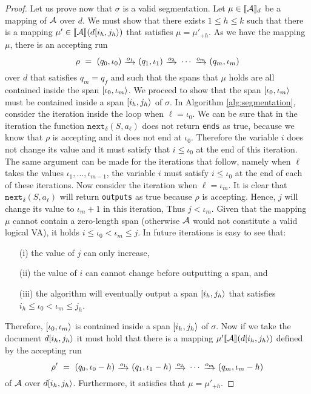 \begin{proof}
    Let us prove now that $\sigma$ is a valid segmentation. Let $\mu \in
    \llbracket\mathcal{A}\rrbracket_d$ be a mapping of $\mathcal{A}$ over $d$. We must show that there exists
    $1 \leq h \leq k$ such that there is a mapping $\mu' \in
    \llbracket\mathcal{A}\rrbracket(d[i_h, j_h\rangle)$ that satisfies $\mu = \mu'_{+h}$. As we have
    the mapping $\mu$, there is an accepting run 
    $$
    \rho \ = \ (q_0, \iota_0) \ \trans{o_1} \ (q_1, \iota_1) \ \trans{o_2} \ \cdots \ \trans{o_m} \ (q_m, \iota_m)
    $$ 
    over $d$ that satisfies $q_m = q_f$ and such that the spans that $\mu$ holds
    are all contained inside the span $[\iota_0, \iota_m\rangle$. We proceed to
    show that the span $[\iota_0, \iota_m\rangle$ must be contained inside a
    span $[i_h, j_h\rangle$ of $\sigma$. In Algorithm \ref{alg:segmentation},
    consider the iteration inside the loop when $\ell = \iota_0$. We can be sure
    that in the iteration the function $\texttt{next}_\delta(S, a_\ell)$ does
    not return \texttt{ends} as true, because we know that $\rho$ is accepting
    and it does not end at $\iota_0$. Therefore the variable $i$ does not change
    its value and it must satisfy that $i \leq \iota_0$ at the end of this
    iteration. The same argument can be made for the iterations that follow,
    namely when $\ell$ takes the values $\iota_1, \ldots, \iota_{m-1}$, the
    variable $i$ must satisfy $i \leq \iota_0$ at the end of each of these
    iterations. Now consider the iteration when $\ell = \iota_m$. It is clear
    that $\texttt{next}_\delta(S, a_\ell)$ will return \texttt{outputs} as true
    because $\rho$ is accepting. Hence, $j$ will change its value to $\iota_m +
    1$ in this iteration, Thus $j < \iota_m$. Given that the mapping $\mu$
    cannot contain a zero-length span (otherwise $\mathcal{A}$ would not constitute a
    valid logical VA), it holds $i \leq \iota_0 < \iota_m \leq j$. In future
    iterations is easy to see that:
    \begin{enumerate}
        \item[(i)] the value of $j$ can only increase,
        \item[(ii)] the value of $i$ can cannot change before outputting a span,
        and
        \item[(iii)] the algorithm will eventually output a span $[i_h,
        j_h\rangle$ that satisfies $i_h \leq \iota_0 < \iota_m \leq j_h$. 
    \end{enumerate}
    Therefore, $[\iota_0, \iota_m\rangle$ is contained inside a span
    $[i_h, j_h\rangle$ of $\sigma$. Now if we take the document $d[i_h,
    j_h\rangle$ it must hold that there is a mapping $\mu' \llbracket\mathcal{A}\rrbracket(d[i_h,
    j_h\rangle)$ defined by the accepting run 
    $$
    \rho' \ = \ (q_0, \iota_0-h) \ \trans{o_1} \ (q_1, \iota_1-h) \ \trans{o_2} \ \cdots \ \trans{o_m} \ (q_m, \iota_m-h)
    $$ 
    of $\mathcal{A}$ over $d[i_h, j_h\rangle$. Furthermore, it satisfies that $\mu =
    \mu'_{+h}$.


\end{proof}
